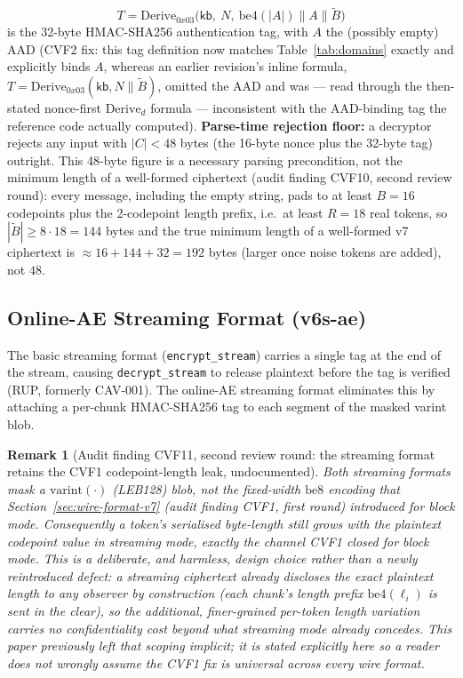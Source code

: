 \documentclass[11pt,a4paper]{article}
\newtheorem{remark}[theorem]{Remark}
\begin{document}
\[
  T = \mathrm{Derive}_{0x03}\bigl(\mathsf{kb},\ N,\ \mathrm{be4}(|A|) \| A \| \widetilde{B}\bigr)
\]
is the 32-byte HMAC-SHA256 authentication tag, with $A$ the (possibly empty)
AAD (CVF2 fix: this tag definition now matches Table~\ref{tab:domains}
exactly and explicitly binds $A$, whereas an earlier revision's inline
formula, $T = \mathrm{Derive}_{0x03}(\mathsf{kb}, N \| \widetilde{B})$, omitted
the AAD and was — read through the then-stated nonce-first
$\mathrm{Derive}_d$ formula — inconsistent with the AAD-binding tag the
reference code actually computed). \textbf{Parse-time rejection floor:} a
decryptor rejects any input with $|C| < 48$ bytes (the 16-byte nonce plus
the 32-byte tag) outright. This 48-byte figure is a necessary parsing
precondition, not the minimum length of a well-formed ciphertext (audit
finding CVF10, second review round): every message, including the empty
string, pads to at least $B=16$ codepoints plus the 2-codepoint length
prefix, i.e.\ at least $R=18$ real tokens, so $|\widetilde{B}| \geq 8\cdot 18=144$
bytes and the true minimum length of a well-formed v7 ciphertext is
$\approx 16+144+32=192$ bytes (larger once noise tokens are added), not
$48$.

\subsection{Online-AE Streaming Format (v6s-ae)}
\label{sec:streaming-ae}

The basic streaming format (\texttt{encrypt\_stream}) carries a single tag at the
end of the stream, causing \texttt{decrypt\_stream} to release plaintext before
the tag is verified (RUP, formerly CAV-001).  The online-AE streaming format
eliminates this by attaching a per-chunk HMAC-SHA256 tag to each segment of the
masked varint blob.

\begin{remark}[Audit finding CVF11, second review round: the streaming format retains the CVF1 codepoint-length leak, undocumented]
\label{rem:v2cvf11}
Both streaming formats mask a $\mathrm{varint}(\cdot)$ (LEB128) blob, not
the fixed-width $\mathrm{be8}$ encoding that Section~\ref{sec:wire-format-v7}
(audit finding CVF1, first round) introduced for block mode. Consequently a
token's serialised byte-length still grows with the plaintext codepoint
value in streaming mode, exactly the channel CVF1 closed for block mode.
This is a deliberate, and harmless, design choice rather than a newly
reintroduced defect: a streaming ciphertext already discloses the exact
plaintext length to any observer by construction (each chunk's length
prefix $\mathrm{be4}(\ell_i)$ is sent in the clear), so the additional,
finer-grained per-token length variation carries no confidentiality cost
beyond what streaming mode already concedes. This paper previously left
that scoping implicit; it is stated explicitly here so a reader does not
wrongly assume the CVF1 fix is universal across every wire format.
\end{remark}
\end{document}
